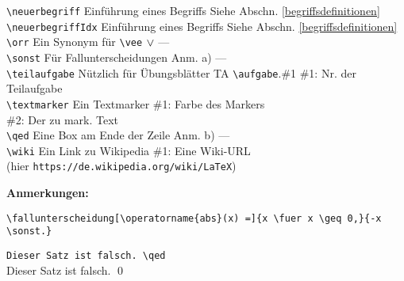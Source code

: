\begin{tabbing}
				\verb|\neuerbegriff|\> Einführung eines Begriffs				\> Siehe Abschn. \ref{begriffsdefinitionen}				\\
				\verb|\neuerbegriffIdx| 
									\>Einführung eines Begriffs					\> Siehe Abschn. \ref{begriffsdefinitionen}				\\
				\verb|\orr|			\> Ein Synonym für \verb|\vee|				\> $\vee$ 				\> ---							\\
				\verb|\sonst|		\> Für Fallunterscheidungen					\> Anm. a)				\> ---							\\
				\verb|\teilaufgabe|	\> Nützlich für Übungsblätter				\> TA \verb|\aufgabe|.\#1 	
																										\> \#1: Nr. der Teilaufgabe 	\\
				\verb|\textmarker|	\> Ein Textmarker							\> \textmarker{green}{Text}
																										\> \#1: Farbe des Markers		\\
									\>											\>						\> \#2: Der zu mark. Text 		\\
				\verb|\qed|			\> Eine Box am Ende der Zeile				\> Anm. b)				\> ---							\\
				\verb|\wiki|		\> Ein Link zu Wikipedia					\>
																										\> \#1: Eine Wiki-URL			\\
									\>  (hier \texttt{https://de.wikipedia.org/wiki/LaTeX})
			\end{tabbing}
			\newpage
			\textbf{Anmerkungen:}
			\begin{enumeratealpha}
				\item \verb||
						\fallunterscheidung[\operatorname{abs}(x) =]{x \fuer x \geq 0,}{-x \sonst.}
				\item \verb|Dieser Satz ist falsch. \qed| \\
						Dieser Satz ist falsch. \qed
			\end{enumeratealpha}
